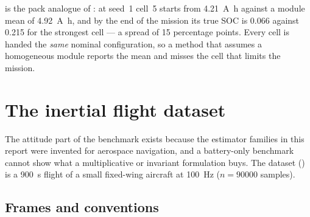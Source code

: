  is the pack analogue of : at seed~1 cell~5 starts from
\SI{4.21}{\ampere\hour} against a module mean of \SI{4.92}{\ampere\hour}, and by the end of the
mission its true SOC is \num{0.066} against \num{0.215} for the strongest cell --- a spread of
\num{15} percentage points. Every cell is handed the \emph{same} nominal configuration, so a method
that assumes a homogeneous module reports the mean and misses the cell that limits the mission.


\section{The inertial flight dataset}
\label{sec:ds-imu}

The attitude part of the benchmark exists because the estimator families in this report were
invented for aerospace navigation, and a battery-only benchmark cannot show what a multiplicative or
invariant formulation buys. The dataset () is a \SI{900}{\second}
flight of a small fixed-wing aircraft at \SI{100}{\hertz} ($n=\num{90000}$ samples).

\subsection{Frames and conventions}

